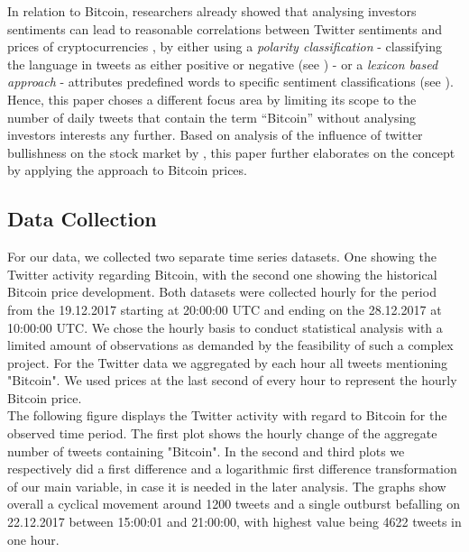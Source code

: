 \documentclass[a4paper,american,12pt]{article}
\begin{document}
\begin{spacing}{1.2}
In relation to Bitcoin, researchers already showed that analysing investors sentiments can lead to reasonable correlations between Twitter sentiments and prices of cryptocurrencies \textcite[p.~7]{stenqvist2017predicting} , by either using a \textit{polarity classification} {-} classifying the language in tweets as either positive or negative (see \cite{colianni2015algorithmic}) {-} or a \textit{lexicon based approach} {-} attributes predefined words to specific sentiment classifications (see \cite{stenqvist2017predicting}). Hence, this paper choses a different focus area by limiting its scope to the number of daily tweets that contain the term “Bitcoin” without analysing investors interests any further. Based on analysis of the influence of twitter bullishness on the stock market by \textcite{mao2015quantifying}, this paper further elaborates on the concept by applying the approach to Bitcoin prices.\\

		
\subsection{Data Collection}
For our data, we collected two separate time series datasets. One showing the Twitter activity regarding Bitcoin, with the second one showing the historical Bitcoin price development. Both datasets were collected hourly for the period from the 19.12.2017 starting at 20:00:00 UTC and ending on the 28.12.2017 at 10:00:00 UTC. We chose the hourly basis to conduct statistical analysis with a limited amount of observations as demanded by the feasibility of such a complex project. For the Twitter data we aggregated by each hour all tweets mentioning "Bitcoin". We used prices at the last second of every hour to represent the hourly Bitcoin price.\\
The following figure displays the Twitter activity with regard to Bitcoin for the observed time period. The first plot shows the hourly change of the aggregate number of tweets containing "Bitcoin". In the second and third plots we respectively did a first difference and a logarithmic first difference transformation of our main variable, in case it is needed in the later analysis. The graphs show overall a cyclical movement around 1200 tweets and a single outburst befalling on 22.12.2017 between 15:00:01 and 21:00:00, with highest value being 4622 tweets in one hour.\\


\end{spacing}
\end{document}
